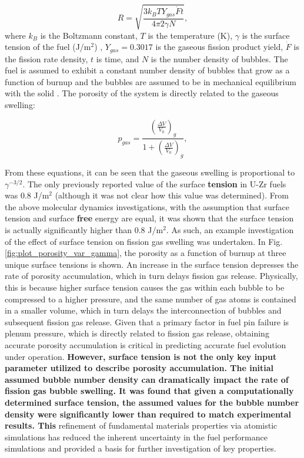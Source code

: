 \documentclass[review]{elsarticle}
\providecommand{\DIFaddtex}[1]{{\bf #1}} %
\providecommand{\DIFdeltex}[1]{} %
\providecommand{\DIFaddbegin}{\protect\color{blue}} %
\providecommand{\DIFaddend}{\protect\color{black}} %
\providecommand{\DIFdelbegin}{\protect\color{red}} %
\providecommand{\DIFdelend}{\protect\color{black}} %
\providecommand{\DIFadd}[1]{\texorpdfstring{\DIFaddtex{#1}}{#1}} %
\providecommand{\DIFdel}[1]{\texorpdfstring{\DIFdeltex{#1}}{}} %
\newcommand{\DIFscaledelfig}{0.5}
\newlength{\DIFdelgraphicswidth} %
\newlength{\DIFdelgraphicsheight} %
\newcommand{\DIFaddincludegraphics}[2][]{{\color{blue}\fbox{\DIFOincludegraphics[#1]{#2}}}} %
\newcommand{\DIFdelincludegraphics}[2][]{%
\sbox{\DIFdelgraphicsbox}{\DIFOincludegraphics[#1]{#2}}%
\settoboxwidth{\DIFdelgraphicswidth}{\DIFdelgraphicsbox} %
\settoboxtotalheight{\DIFdelgraphicsheight}{\DIFdelgraphicsbox} %
\scalebox{\DIFscaledelfig}{%
\parbox[b]{\DIFdelgraphicswidth}{\usebox{\DIFdelgraphicsbox}\\[-\baselineskip] \rule{\DIFdelgraphicswidth}{0em}}\llap{\resizebox{\DIFdelgraphicswidth}{\DIFdelgraphicsheight}{%
\setlength{\unitlength}{\DIFdelgraphicswidth}%
\begin{picture}(1,1)%
\thicklines\linethickness{2pt} %
{\color[rgb]{1,0,0}\put(0,0){\framebox(1,1){}}}%
{\color[rgb]{1,0,0}\put(0,0){\line( 1,1){1}}}%
{\color[rgb]{1,0,0}\put(0,1){\line(1,-1){1}}}%
\end{picture}%
}\hspace*{3pt}}} %
} %
\DeclareRobustCommand{\DIFaddbegin}{\DIFOaddbegin \let\includegraphics\DIFaddincludegraphics} %
\DeclareRobustCommand{\DIFaddend}{\DIFOaddend \let\includegraphics\DIFOincludegraphics} %
\DeclareRobustCommand{\DIFdelbegin}{\DIFOdelbegin \let\includegraphics\DIFdelincludegraphics} %
\DeclareRobustCommand{\DIFdelend}{\DIFOaddend \let\includegraphics\DIFOincludegraphics} %
\begin{document}
\begin{equation}
  \label{bubble_radius}
  R = \sqrt{\frac{3 k_B T Y_{gas} \dot{F} t}{4 \pi 2 \gamma N}},
\end{equation} where $k_B$ is the Boltzmann constant, $T$ is the temperature (K), $\gamma$ is the surface tension of the fuel (J/m$^2$) \cite{karahan2009}, $Y_{gas}=0.3017$ is the gaseous fission product yield, $\dot{F}$ is the fission rate density, $t$ is time, and $N$ is the number density of bubbles. The fuel is assumed to exhibit a constant number density of bubbles that grow as a function of burnup and the bubbles are assumed to be in mechanical equilibrium with the solid \cite{olander76}. The porosity of the system is directly related to the gaseous swelling: 

\begin{equation}
  p_{gas} = \frac{\left(\frac{\Delta V}{V_0}\right)_{g}}{1 + \left(\frac{\Delta V}{V_0}\right)_{g}},
\end{equation}

From these equations, it can be seen that the gaseous swelling is proportional to $\gamma^{-3/2}$. The only previously reported value of the surface \DIFdelbegin \DIFdel{energy }\DIFdelend \DIFaddbegin \DIFadd{tension }\DIFaddend in U-Zr fuels was 0.8 J/m$^2$ \cite{tsuboi1992} (although it was not clear how this value was determined). From the above molecular dynamics investigations, with the assumption that surface tension and surface \DIFaddbegin \DIFadd{free }\DIFaddend energy are equal, it was shown that the surface tension is actually significantly higher than 0.8 J/m$^2$. As such, an example investigation of the effect of surface tension on fission gas swelling was undertaken. In Fig. \ref{fig:plot_porosity_var_gamma}, the porosity as a function of burnup at three unique surface tensions is shown. An increase in the surface tension depresses the rate of porosity accumulation, which in turn delays fission gas release. Physically, this is because higher surface tension causes the gas within each bubble to be compressed to a higher pressure, and the same number of gas atoms is contained in a smaller volume, which in turn delays the interconnection of bubbles and subsequent fission gas release. Given that a primary factor in fuel pin failure is plenum pressure, which is directly related to fission gas release, obtaining accurate porosity accumulation is critical in predicting accurate fuel evolution under operation. \DIFdelbegin \DIFdel{The }\DIFdelend \DIFaddbegin \DIFadd{However, surface tension is not the only key input parameter utilized to describe porosity accumulation. The initial assumed bubble number density can dramatically impact the rate of fission gas bubble swelling. It was found that given a computationally determined surface tension, the assumed values for the bubble number density were significantly lower than required to match experimental results. This }\DIFaddend refinement of fundamental materials properties via atomistic simulations has reduced the inherent uncertainty in the fuel performance simulations and provided a basis for further investigation of key properties. 
\end{document}

